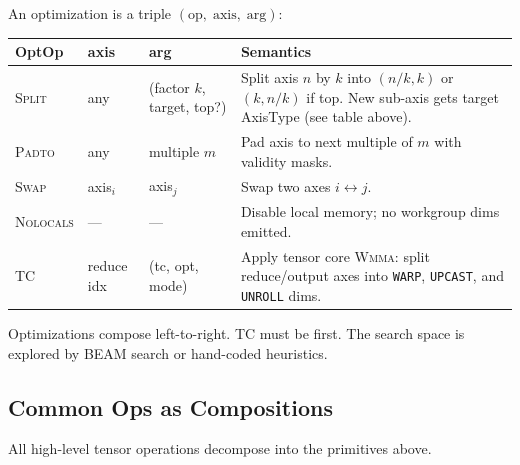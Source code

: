 \documentclass[10pt,letterpaper]{article}
\newcommand{\op}[1]{\textsc{#1}}
\begin{document}
\medskip
An optimization is a triple $(\mathrm{op},\;\mathrm{axis},\;\mathrm{arg})$:

\smallskip
\begin{tabular}{@{}l l l p{6.5cm}@{}}
\toprule
\textbf{OptOp} & \textbf{axis} & \textbf{arg} & \textbf{Semantics} \\
\midrule
\op{Split} & any & (factor $k$, target, top?) &
  Split axis $n$ by $k$ into $(n/k, k)$ or $(k, n/k)$ if top. New sub-axis gets target AxisType (see table above). \\
\op{Padto} & any & multiple $m$ &
  Pad axis to next multiple of $m$ with validity masks. \\[4pt]
\op{Swap} & axis$_i$ & axis$_j$ &
  Swap two axes $i \leftrightarrow j$. \\
\op{Nolocals} & --- & --- &
  Disable local memory; no workgroup dims emitted. \\
\op{TC} & reduce idx & (tc, opt, mode) &
  Apply tensor core \op{Wmma}: split reduce/output axes into \texttt{WARP}, \texttt{UPCAST}, and \texttt{UNROLL} dims. \\
\bottomrule
\end{tabular}

\smallskip
Optimizations compose left-to-right. \op{TC} must be first. The search space is explored by BEAM search or hand-coded heuristics.

\subsection*{Common Ops as Compositions}

All high-level tensor operations decompose into the primitives above.
\end{document}
